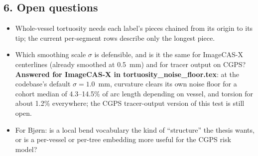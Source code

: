 \subsection*{6. Open questions}

\begin{itemize}
  \item Whole-vessel tortuosity needs each label's pieces chained from its origin to its tip; the
    current per-segment rows describe only the longest piece.
  \item Which smoothing scale $\sigma$ is defensible, and is it the same for ImageCAS-X centerlines
    (already smoothed at 0.5~mm) and for tracer output on CGPS? \textbf{Answered for ImageCAS-X in
    tortuosity\_noise\_floor.tex}: at the codebase's default $\sigma=1.0$~mm, curvature clears its
    own noise floor for a cohort median of 4.3--14.5\% of arc length depending on vessel, and
    torsion for about 1.2\% everywhere; the CGPS tracer-output version of this test is still open.
  \item For Bj{\o}rn: is a local bend vocabulary the kind of ``structure'' the thesis wants, or is a
    per-vessel or per-tree embedding more useful for the CGPS risk model?
\end{itemize}
